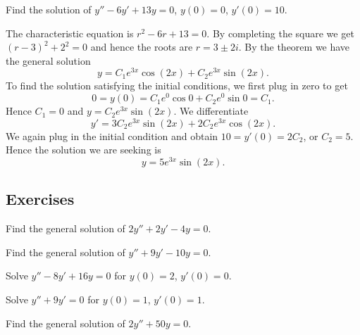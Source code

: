 \documentclass[12pt]{book}
\begin{document}
\begin{example}
Find the solution of $y'' - 6 y' + 13 y = 0$, $y(0) = 0$, $y'(0) =
10$.

The characteristic equation is $r^2 - 6 r + 13 = 0$.  By completing the
square we get ${(r-3)}^2 + 2^2 = 0$ and hence the roots are
$r = 3 \pm 2i$.
By the theorem we have the general solution
\begin{equation*}
y = C_1 e^{3x} \cos (2x) + C_2 e^{3x} \sin (2x) .
\end{equation*}
To find the solution satisfying the initial conditions, we first plug in zero
to get
\begin{equation*}
0 = y(0) = C_1 e^{0} \cos 0 + C_2 e^{0} \sin 0  = C_1 .
\end{equation*}
Hence $C_1 = 0$ and $y = C_2 e^{3x} \sin (2x)$.  We differentiate
\begin{equation*}
y' = 3C_2 e^{3x} \sin (2x) + 2C_2 e^{3x} \cos (2x) .
\end{equation*}
We again plug in the initial condition and obtain $10 = y'(0) = 2C_2$, or
$C_2 = 5$.  Hence the solution we are seeking is
\begin{equation*}
y = 5 e^{3x} \sin (2x) .
\end{equation*}
\end{example}

\subsection{Exercises}

\begin{exercise}
Find the general solution of $2y'' + 2y' -4 y = 0$.
\end{exercise}

\begin{exercise}
Find the general solution of $y'' + 9y' - 10 y = 0$.
\end{exercise}

\begin{exercise}
Solve $y'' - 8y' + 16 y = 0$ for $y(0) = 2$, $y'(0) = 0$.
\end{exercise}

\begin{exercise}
Solve $y'' + 9y' = 0$ for $y(0) = 1$, $y'(0) = 1$.
\end{exercise}

\begin{exercise}
Find the general solution of $2y'' + 50y = 0$.
\end{exercise}
\end{document}
